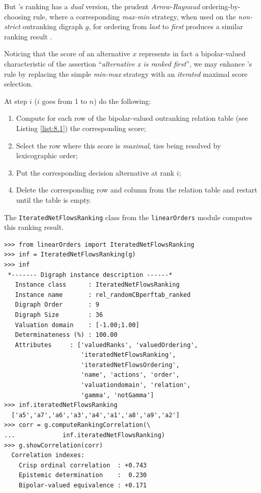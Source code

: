 But \Kohler 's ranking has a \emph{dual} version, the prudent \emph{Arrow-Raynaud} ordering-by-choosing rule, where a corresponding \emph{max-min} strategy, when used on the \emph{non-strict} outranking digraph $g$, for ordering from \emph{last} to \emph{first} produces a similar ranking result \citep{ARR-1986}.

Noticing that the \NetFlows score of an alternative $x$ represents in fact a bipolar-valued characteristic of the assertion ``\emph{alternative x is ranked first}'', we may enhance \Kohler 's rule by replacing the simple \emph{min-max} strategy with an \emph{iterated} maximal \NetFlows score selection.

\begin{definition}
  
\noindent At step $i$ ($i$ goes from 1 to $n$) do the following:
\begin{enumerate}[leftmargin=0.5cm,rightmargin=0.5cm]
\item Compute for each row of the bipolar-valued outranking relation table (see Listing \ref{list:8.1}) the corresponding \NetFlows score;
\item Select the row where this score is \emph{maximal}, ties being resolved by lexicographic order;
\item Put the corresponding decision alternative at rank $i$;
\item Delete the corresponding row and column from the relation table and restart until the table is empty.
\end{enumerate}
\end{definition}

The \texttt{IteratedNetFlowsRanking} class from the \texttt{linearOrders} module computes this ranking result. 
\begin{lstlisting}[caption={Ranking-by-choosing with iterated maximal \NetFlows scores},label=list:8.14]   
>>> from linearOrders import IteratedNetFlowsRanking  
>>> inf = IteratedNetFlowsRanking(g)
>>> inf
 *------- Digraph instance description ------*
   Instance class      : IteratedNetFlowsRanking
   Instance name       : rel_randomCBperftab_ranked
   Digraph Order       : 9
   Digraph Size        : 36
   Valuation domain    : [-1.00;1.00]
   Determinateness (%) : 100.00
   Attributes     : ['valuedRanks', 'valuedOrdering',
                     'iteratedNetFlowsRanking',
                     'iteratedNetFlowsOrdering',
                     'name', 'actions', 'order',
                     'valuationdomain', 'relation',
                     'gamma', 'notGamma']
>>> inf.iteratedNetFlowsRanking
  ['a5','a7','a6','a3','a4','a1','a8','a9','a2']
>>> corr = g.computeRankingCorrelation(\
...             inf.iteratedNetFlowsRanking)
>>> g.showCorrelation(corr)
  Correlation indexes:
    Crisp ordinal correlation  : +0.743
    Epistemic determination    :  0.230
    Bipolar-valued equivalence : +0.171
\end{lstlisting}

